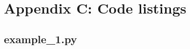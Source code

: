 \newpage\section*{Appendix C: Code listings\label{appendix:c}}

\linespread{1.1}
\subsection*{example\_1.py}



